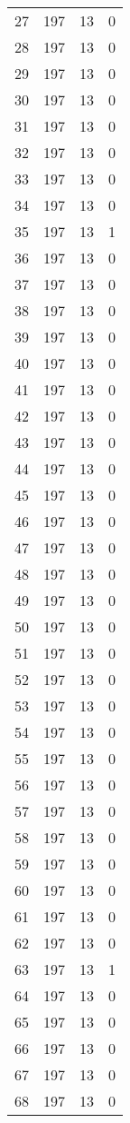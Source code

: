 \begin{longtable}[!]{c|ccc}
	27	& 197	& 13	& 0	\\
	28	& 197	& 13	& 0	\\
	29	& 197	& 13	& 0	\\
	30	& 197	& 13	& 0	\\
	31	& 197	& 13	& 0	\\
	32	& 197	& 13	& 0	\\
	33	& 197	& 13	& 0	\\
	34	& 197	& 13	& 0	\\
	35	& 197	& 13	& 1	\\
	36	& 197	& 13	& 0	\\
	37	& 197	& 13	& 0	\\
	38	& 197	& 13	& 0	\\
	39	& 197	& 13	& 0	\\
	40	& 197	& 13	& 0	\\
	41	& 197	& 13	& 0	\\
	42	& 197	& 13	& 0	\\
	43	& 197	& 13	& 0	\\
	44	& 197	& 13	& 0	\\
	45	& 197	& 13	& 0	\\
	46	& 197	& 13	& 0	\\
	47	& 197	& 13	& 0	\\
	48	& 197	& 13	& 0	\\
	49	& 197	& 13	& 0	\\
	50	& 197	& 13	& 0	\\
	51	& 197	& 13	& 0	\\
	52	& 197	& 13	& 0	\\
	53	& 197	& 13	& 0	\\
	54	& 197	& 13	& 0	\\
	55	& 197	& 13	& 0	\\
	56	& 197	& 13	& 0	\\
	57	& 197	& 13	& 0	\\
	58	& 197	& 13	& 0	\\
	59	& 197	& 13	& 0	\\
	60	& 197	& 13	& 0	\\
	61	& 197	& 13	& 0	\\
	62	& 197	& 13	& 0	\\
	63	& 197	& 13	& 1	\\
	64	& 197	& 13	& 0	\\
	65	& 197	& 13	& 0	\\
	66	& 197	& 13	& 0	\\
	67	& 197	& 13	& 0	\\
	68	& 197	& 13	& 0	\\

\end{longtable}
